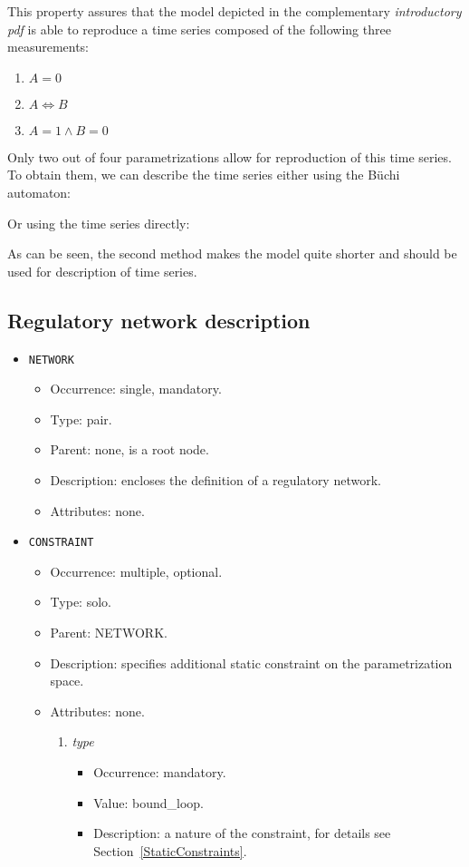 \documentclass[12pt]{article}
\newenvironment{menum}{
\begin{enumerate}
  \setlength{\itemsep}{0pt}
  \setlength{\parskip}{0pt}
  \setlength{\parsep}{0pt}
}{\end{enumerate}}
\newenvironment{mitem}{
\begin{itemize}
  \setlength{\itemsep}{0pt}
  \setlength{\parskip}{0pt}
  \setlength{\parsep}{0pt}
}{\end{itemize}}
\begin{document}
This property assures that the model depicted in the complementary \emph{introductory pdf} is able to reproduce a time series composed of the following three measurements:
\begin{enumerate}
\item $A=0$
\item $A \Leftrightarrow B$
\item $A=1 \wedge B=0$
\end{enumerate}
Only two out of four parametrizations allow for reproduction of this time series. To obtain them, we can describe the time series either using the B\"uchi automaton:
\begin{alltt}

\end{alltt}
Or using the time series directly:
\begin{alltt}

\end{alltt}
As can be seen, the second method makes the model quite shorter and should be used for description of time series.

\subsection{Regulatory network description}
\begin{mitem}
	\item \texttt{NETWORK}
	\begin{mitem}
		\item Occurrence: single, mandatory.
		\item Type: pair.
		\item Parent: none, is a root node.
		\item Description: encloses the definition of a regulatory network.
		\item Attributes: none.
	\end{mitem}
\end{mitem}

\begin{mitem}
	\item \texttt{CONSTRAINT}
	\begin{mitem}
		\item Occurrence: multiple, optional.
		\item Type: solo.
		\item Parent: NETWORK.
		\item Description: specifies additional static constraint on the parametrization space.
		\item Attributes: none.
		\begin{menum}
			\item \textit{type} 
			\begin{mitem}
				\item Occurrence: mandatory.
				\item Value: bound\_loop.
				\item Description: a nature of the constraint, for details see Section~\ref{StaticConstraints}.
			\end{mitem}
		\end{menum}
	\end{mitem}
\end{mitem}
	
\end{document}
